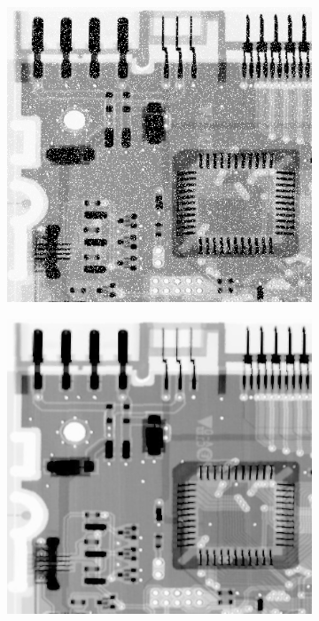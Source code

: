 \begin{figure}[h]
\begin{subfigure}[b]{0.4\linewidth}
		\includegraphics[width=\linewidth]{myfigure/p4/42-salt.png}
		\caption{}
		\label{fig:5-8b}
	\end{subfigure}
  	\begin{subfigure}[b]{0.4\linewidth}
		\includegraphics[width=\linewidth]{myfigure/p4/42-pepper-contraharmo.png}

\end{subfigure}
\end{figure}
